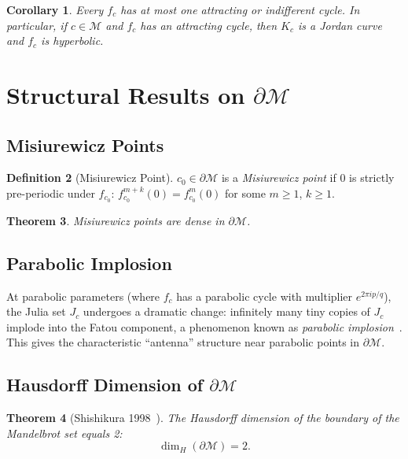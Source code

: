 \documentclass[12pt,a4paper]{amsart}
\newtheorem{theorem}{Theorem}[section]
\newtheorem{corollary}[theorem]{Corollary}
\theoremstyle{definition}
\newtheorem{definition}[theorem]{Definition}
\theoremstyle{remark}
\begin{document}
\begin{corollary}
Every $f_c$ has at most one attracting or indifferent cycle. In particular,
if $c \in \mathcal{M}$ and $f_c$ has an attracting cycle, then $K_c$ is
a Jordan curve and $f_c$ is hyperbolic.
\end{corollary}

\section{Structural Results on \texorpdfstring{$\partial\mathcal{M}$}{∂M}}

\subsection{Misiurewicz Points}

\begin{definition}[Misiurewicz Point]
$c_0 \in \partial \mathcal{M}$ is a \emph{Misiurewicz point} if $0$ is
strictly pre-periodic under $f_{c_0}$: $f_{c_0}^{m+k}(0) = f_{c_0}^m(0)$
for some $m \geq 1$, $k \geq 1$.
\end{definition}

\begin{theorem}
Misiurewicz points are dense in $\partial \mathcal{M}$.
\end{theorem}

\subsection{Parabolic Implosion}

At parabolic parameters (where $f_c$ has a parabolic cycle with multiplier
$e^{2\pi i p/q}$), the Julia set $J_c$ undergoes a dramatic change:
infinitely many tiny copies of $J_c$ implode into the Fatou component,
a phenomenon known as \emph{parabolic implosion}~\cite{LavaursRousseau1993}.
This gives the characteristic ``antenna'' structure near parabolic points
in $\partial\mathcal{M}$.

\subsection{Hausdorff Dimension of $\partial \mathcal{M}$}

\begin{theorem}[Shishikura 1998~\cite{Shishikura1998}]
The Hausdorff dimension of the boundary of the Mandelbrot set equals 2:
\[
    \dim_H(\partial \mathcal{M}) = 2.
\]
\end{theorem}
\end{document}
